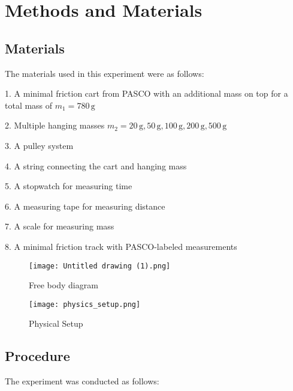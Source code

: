\section{Methods and Materials}

\subsection{Materials}
The materials used in this experiment were as follows:

1. A minimal friction cart from PASCO with  an additional mass on top for a total mass of \( m_1 = 780 \, \text{g} \)

2. Multiple hanging masses \( m_2 = 20 \, \text{g}, 50 \, \text{g}, 100 \, \text{g}, 200 \, \text{g}, 500 \, \text{g} \)

3. A pulley system

4. A string connecting the cart and hanging mass

5. A stopwatch for measuring time

6. A measuring tape for measuring distance

7. A scale for measuring mass

8. A minimal friction track with PASCO-labeled measurements

\begin{figure}[H]
    \centering
    \texttt{[image: Untitled drawing (1).png]}
    \caption{Free body diagram}
    \label{fig:freebody}
\end{figure}

\begin{figure}[H]
    \centering
    \texttt{[image: physics\_setup.png]}
    \caption{Physical Setup}
    \label{fig:setup}
\end{figure}




\subsection{Procedure}

The experiment was conducted as follows:

